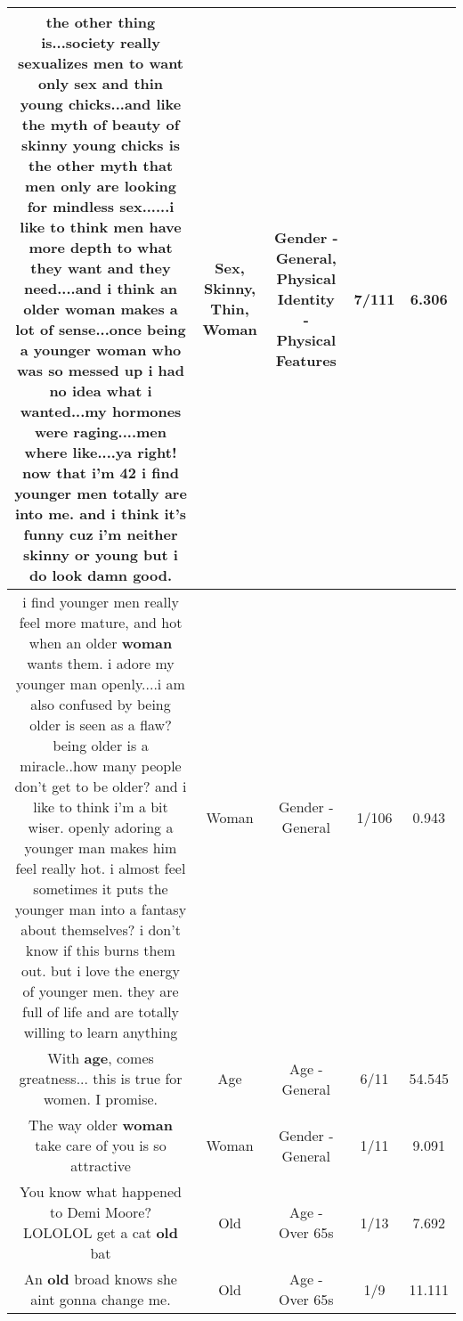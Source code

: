 \documentclass[11pt]{article}
\newlength\mylength
\begin{document}
\begin{center}
\begin{longtable}{|C{.65\mylength}|C{.30\mylength}|C{.12\mylength}|C{.12\mylength}|C{.12\mylength}|}
  \small the other thing is...society really sexualizes men to want only \textbf{sex} and \textbf{thin} young chicks...and like the myth of beauty of \textbf{skinny} young chicks is the other myth that men only are looking for mindless \textbf{sex}......i like to think men have more depth to what they want and they need....and i think an older \textbf{woman} makes a lot of sense...once being a younger \textbf{woman} who was so messed up i had no idea what i wanted...my hormones were raging....men where like....ya right!  now that i'm 42 i find younger men totally are into me. and i think it's funny cuz i'm neither \textbf{skinny} or young but i do look damn good.\normalsize   & Sex, Skinny, Thin, Woman & Gender - General, Physical Identity - Physical Features & 7/111 & 6.306 \\  \hline
  \small i find younger men really feel more mature, and hot when an older \textbf{woman} wants them. i adore my younger man openly....i am also confused by being older is seen as a flaw? being older is a miracle..how many people don't get to be older? and i like to think i'm a bit wiser.  openly adoring a younger man makes him feel really hot. i almost feel sometimes it puts the younger man into a fantasy about themselves? i don't know if this burns them out. but i love the energy of younger men. they are full of life and are totally willing to learn anything\normalsize   & Woman & Gender - General & 1/106 & 0.943 \\  \hline
  \small With \textbf{age}, comes greatness... this is true for women. I promise.\normalsize   & Age & Age - General & 6/11 & 54.545 \\  \hline
  \small The way older \textbf{woman} take care of you is so attractive\normalsize   & Woman & Gender - General & 1/11 & 9.091 \\  \hline
  \small You know what happened to Demi Moore? LOLOLOL get a cat \textbf{old} bat\normalsize   & Old & Age - Over 65s & 1/13 & 7.692 \\  \hline
  \small An \textbf{old} broad knows she aint gonna change me.\normalsize   & Old & Age - Over 65s & 1/9 & 11.111 \\  \hline

\end{longtable}
\end{center}
\end{document}
